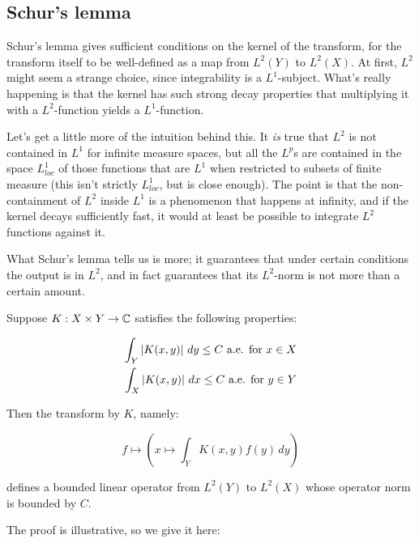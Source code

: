 \documentclass[a4paper]{amsart}
\begin{document}
\subsection{Schur's lemma}

Schur's lemma gives sufficient conditions on the kernel of the
transform, for the transform itself to be well-defined as a map from
$L^2(Y)$ to $L^2(X)$. At first, $L^2$ might seem a strange choice,
since integrability is a $L^1$-subject. What's really happening is
that the kernel has such strong decay properties that multiplying it
with a $L^2$-function yields a $L^1$-function.

Let's get a little more of the intuition behind this. It {\em is} true
that $L^2$ is not contained in $L^1$ for infinite measure spaces, but
all the $L^p$s are contained in the space $L^1_{loc}$ of those
functions that are $L^1$ when restricted to subsets of finite measure
(this isn't strictly $L^1_{loc}$, but is close enough). The point is
that the non-containment of $L^2$ inside $L^1$ is a phenomenon that
happens at infinity, and if the kernel decays sufficiently fast, it
would at least be possible to integrate $L^2$ functions against it.

What Schur's lemma tells us is more; it guarantees that under certain
conditions the output is in $L^2$, and in fact guarantees that its
$L^2$-norm is not more than a certain amount.

\begin{theorem}
  Suppose $K:X \times Y \to \mathbb{C}$ satisfies the following properties:

  \begin{eqnarray*}
    \int_Y \left|K(x,y)\right| \, dy \le C \ \text{a.e. for } x \in X\\
    \int_X \left|K(x,y)\right| \, dx \le C \ \text{a.e. for } y \in Y
  \end{eqnarray*}

  Then the transform by $K$, namely:

  $$f \mapsto \left(x \mapsto \int_Y K(x,y) f(y) \, dy \right)$$

  defines a bounded linear operator from $L^2(Y)$ to $L^2(X)$ whose
  operator norm is bounded by $C$.
\end{theorem}

The proof is illustrative, so we give it here:
\end{document}

